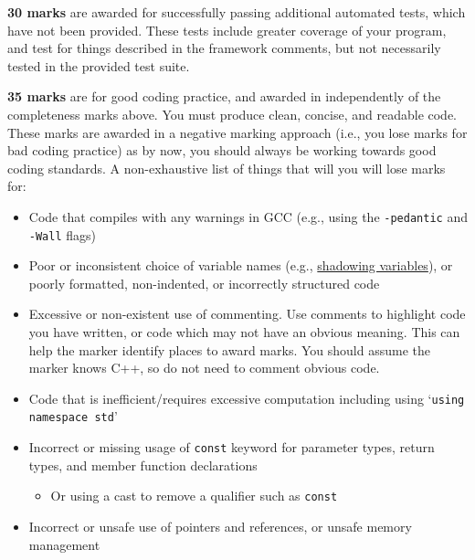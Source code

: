 \documentclass[a4paper]{article}
\begin{document}
\noindent{}\textbf{30 marks} are awarded for successfully passing additional automated tests, which have not been provided. These tests include greater coverage of your program, and test for things described in the framework comments, but not necessarily tested in the provided test suite.

\noindent{}\textbf{35 marks} are for good coding practice, and awarded in independently of the completeness marks above. You must produce clean, concise, and readable code. These marks are awarded in a negative marking approach (i.e., you lose marks for bad coding practice) as by now, you should always be working towards good coding standards. A non-exhaustive list of things that will you will lose marks for:
\begin{itemize}
    \item Code that compiles with any warnings in GCC (e.g., using the \texttt{-pedantic} and \texttt{-Wall} flags)

    \item Poor or inconsistent choice of variable names (e.g., \hyperlink{https://en.wikipedia.org/wiki/Variable_shadowing}{shadowing variables}), or poorly formatted, non-indented, or incorrectly structured code

    \item Excessive or non-existent use of commenting. Use comments to highlight code you have written, or code which may not have an obvious meaning. This can help the marker identify places to award marks. You should assume the marker knows C++, so do not need to comment obvious code.

    \item Code that is inefficient/requires excessive computation including using `\texttt{using namespace std}'

    \item Incorrect or missing usage of \texttt{const} keyword for parameter types, return types, and member function declarations

        \begin{itemize}
            \item Or using a cast to remove a qualifier such as \texttt{const} 
    \end{itemize}

    \item Incorrect or unsafe use of pointers and references, or unsafe memory management


\end{itemize}
\end{document}
